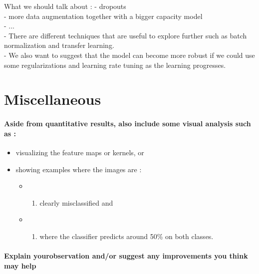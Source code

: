 \documentclass[11pt]{article}
\providecommand{\tightlist}{%
      \setlength{\itemsep}{0pt}\setlength{\parskip}{0pt}}
\begin{document}
What we should talk about : - dropouts\\
- more data augmentation together with a bigger capacity model\\
- ...\\
- There are different techniques that are useful to explore further such
as batch normalization and transfer learning.\\
- We also want to suggest that the model can become more robust if we
could use some regularizations and learning rate tuning as the learning
progresses.

    \section{Miscellaneous}\label{miscellaneous}

\paragraph{Aside from quantitative results, also include some visual
analysis such as
:}\label{aside-from-quantitative-results-also-include-some-visual-analysis-such-as}

\begin{itemize}
\tightlist
\item
  visualizing the feature maps or kernels, or\\
\item
  showing examples where the images are :

  \begin{itemize}
  \item
    \begin{enumerate}
    \def\labelenumi{(\alph{enumi})}
    \tightlist
    \item
      clearly misclassified and\\
    \end{enumerate}
  \item
    \begin{enumerate}
    \def\labelenumi{(\alph{enumi})}
    \setcounter{enumi}{1}
    \tightlist
    \item
      where the classifier predicts around 50\% on both classes.
    \end{enumerate}
  \end{itemize}
\end{itemize}

\paragraph{Explain yourobservation and/or suggest any improvements you
think may
help}\label{explain-yourobservation-andor-suggest-any-improvements-you-think-may-help}
\end{document}
